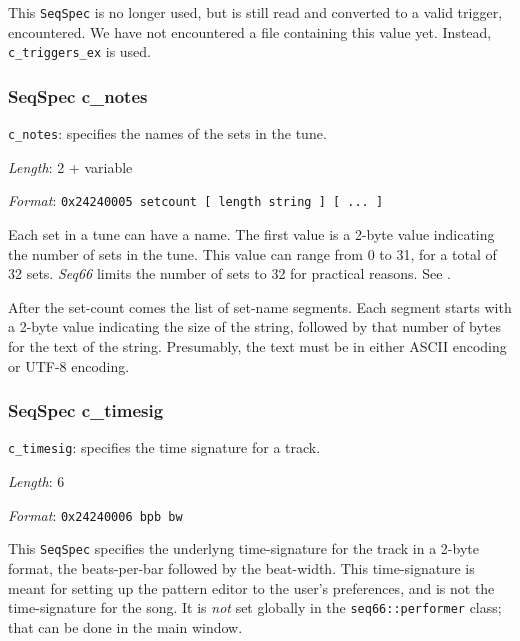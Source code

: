    This \texttt{SeqSpec} is no longer used, but is still read and
   converted to a valid trigger, encountered.
   We have not encountered a file containing this value yet.
   Instead, \texttt{c\_triggers\_ex} is used.

\subsubsection{SeqSpec c\_notes}
\label{subsubsec:midi_format_track_seqspec_notes}


   \begin{description}
      \item \texttt{c\_notes}: specifies the names of the sets in the tune.
      \item \textsl{Length}: 2 + variable
      \item \textsl{Format}: \texttt{0x24240005 setcount [ length string ] [ ... ] }
   \end{description}

   Each set in a tune can have a name.  The first value is a 2-byte value
   indicating the number of sets in the tune.  This value can range from
   0 to 31, for a total of 32 sets.
   \textsl{Seq66} limits the number of sets to 32 for practical reasons.
   See .

   After the set-count comes the list of set-name segments.  Each segment
   starts with a 2-byte value indicating the size of the string, followed
   by that number of bytes for the text of the string.  Presumably, the
   text must be in either ASCII encoding or UTF-8 encoding.

\subsubsection{SeqSpec c\_timesig}
\label{subsubsec:midi_format_track_seqspec_timesig}


   \begin{description}
      \item \texttt{c\_timesig}: specifies the time signature for a track.
      \item \textsl{Length}: 6
      \item \textsl{Format}: \texttt{0x24240006 bpb bw}
   \end{description}

   This \texttt{SeqSpec} specifies the underlyng
   time-signature for the track in a 2-byte
   format, the beats-per-bar followed by the beat-width.
   This time-signature is meant for setting up the pattern editor to the
   user's preferences, and is not the time-signature for the song.
   It is \textsl{not} set globally in the \texttt{seq66::performer} class;
   that can be done in the main window.


